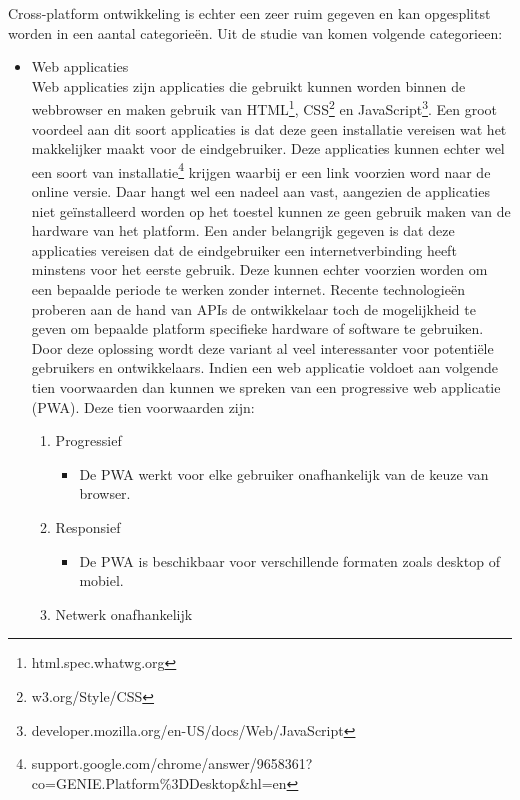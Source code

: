 Cross-platform ontwikkeling is echter een zeer ruim gegeven en kan opgesplitst worden in een aantal categorieën. Uit de studie van \textcite{Xanthopoulos2013} komen volgende categorieen:
\begin{itemize}
    \item Web applicaties\\
    Web applicaties zijn applicaties die gebruikt kunnen worden binnen de webbrowser en maken gebruik van HTML\footnote{html.spec.whatwg.org}, CSS\footnote{w3.org/Style/CSS} en JavaScript\footnote{developer.mozilla.org/en-US/docs/Web/JavaScript}. Een groot voordeel aan dit soort applicaties is dat deze geen installatie vereisen wat het makkelijker maakt voor de eindgebruiker. Deze applicaties kunnen echter wel een soort van installatie\footnote{support.google.com/chrome/answer/9658361?co=GENIE.Platform\%3DDesktop\&hl=en} krijgen waarbij er een link voorzien word naar de online versie. Daar hangt wel een nadeel aan vast, aangezien de applicaties niet geïnstalleerd worden op het toestel kunnen ze geen gebruik maken van de hardware van het platform. Een ander belangrijk gegeven is dat deze applicaties vereisen dat de eindgebruiker een internetverbinding heeft minstens voor het eerste gebruik. Deze kunnen echter voorzien worden om een bepaalde periode te werken zonder internet. Recente technologieën proberen aan de hand van APIs de ontwikkelaar toch de mogelijkheid te geven om bepaalde platform specifieke hardware of software te gebruiken. Door deze oplossing wordt deze variant al veel interessanter voor potentiële gebruikers en ontwikkelaars. Indien een web applicatie voldoet aan volgende tien voorwaarden \autocite{Osmani2015} dan kunnen we spreken van een progressive web applicatie (PWA). Deze tien voorwaarden zijn: 
    \begin{enumerate}
       \item Progressief
       \begin{itemize}
           \item De PWA werkt voor elke gebruiker onafhankelijk van de keuze van browser.
       \end{itemize}
       \item Responsief
       \begin{itemize}
           \item De PWA is beschikbaar voor verschillende formaten zoals desktop of mobiel.
       \end{itemize}
       \item Netwerk onafhankelijk
       \begin{itemize}

\end{itemize}
\end{enumerate}
\end{itemize}
